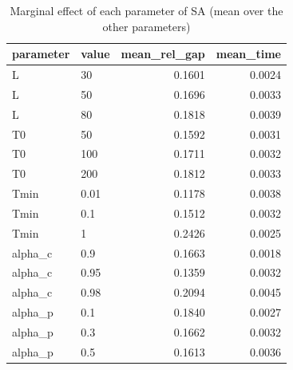 \begin{table}[htbp]
\centering
\small
\caption{Marginal effect of each parameter of SA (mean over the other parameters)}
\label{tab:E8a_tuning_faithful_SA_marginal}
\begin{tabular}{llrr}
\toprule
parameter & value & mean\_rel\_gap & mean\_time \\
\midrule
L & 30 & 0.1601 & 0.0024 \\
L & 50 & 0.1696 & 0.0033 \\
L & 80 & 0.1818 & 0.0039 \\
T0 & 50 & 0.1592 & 0.0031 \\
T0 & 100 & 0.1711 & 0.0032 \\
T0 & 200 & 0.1812 & 0.0033 \\
Tmin & 0.01 & 0.1178 & 0.0038 \\
Tmin & 0.1 & 0.1512 & 0.0032 \\
Tmin & 1 & 0.2426 & 0.0025 \\
alpha\_c & 0.9 & 0.1663 & 0.0018 \\
alpha\_c & 0.95 & 0.1359 & 0.0032 \\
alpha\_c & 0.98 & 0.2094 & 0.0045 \\
alpha\_p & 0.1 & 0.1840 & 0.0027 \\
alpha\_p & 0.3 & 0.1662 & 0.0032 \\
alpha\_p & 0.5 & 0.1613 & 0.0036 \\
\bottomrule
\end{tabular}
\end{table}
